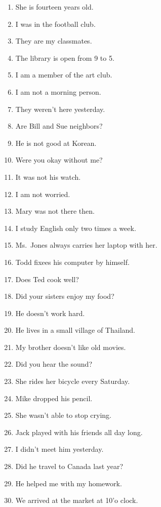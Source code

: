\documentclass[9pt, a4paper,  landscape]{oblivoir}
\begin{document}
    \begin{enumerate}
        \item She is fourteen years old. 
        \item I was in the football club.
        \item They are my classmates.
        \item The library is open from 9 to 5. 
        \item I am a member of the art club.
        \item I am not a morning person. 
        \item They weren't here yesterday. 
        \item Are Bill and Sue neighbors?
        \item He is not good at Korean.
        \item Were you okay without me? 
        \item It was not his watch.
        \item I am not worried. 
        \item Mary was not there then.
        \item I study English only two times a week.
        \item Ms.~Jones always carries her laptop with her.
        \item Todd fixees his computer by himself. 
        \item Does Ted cook well?
        \item Did your sisters enjoy my food? 
        \item He doesn't work hard. 
        \item He lives in a small village of Thailand. 
        \item My brother doesn't like old movies. 
        \item Did you hear the sound? 
        \item She rides her bicycle every Saturday. 
        \item Mike dropped his pencil.
        \item She wasn't able to stop crying. 
        \item Jack played with his friends all day long.
        \item  I didn't meet him yesterday.
        \item Did he travel to Canada last year?
        \item He helped me with my homework. 
        \item We arrived at the market at 10'o clock.

\end{enumerate}
\end{document}
